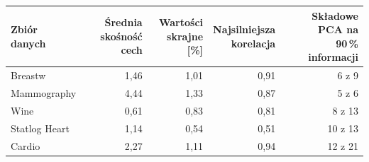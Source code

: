 \begin{tabular}{lrrrr}
\toprule
Zbiór danych & \makecell[r]{Średnia\\skośność cech} & \makecell[r]{Wartości\\skrajne [\%]} & \makecell[r]{Najsilniejsza\\korelacja} & \makecell[r]{Składowe PCA na\\90\,\% informacji} \\
\midrule
Breastw & 1,46 & 1,01 & 0,91 & 6 z 9 \\
Mammography & 4,44 & 1,33 & 0,87 & 5 z 6 \\
Wine & 0,61 & 0,83 & 0,81 & 8 z 13 \\
Statlog Heart & 1,14 & 0,54 & 0,51 & 10 z 13 \\
Cardio & 2,27 & 1,11 & 0,94 & 12 z 21 \\
\bottomrule
\end{tabular}
